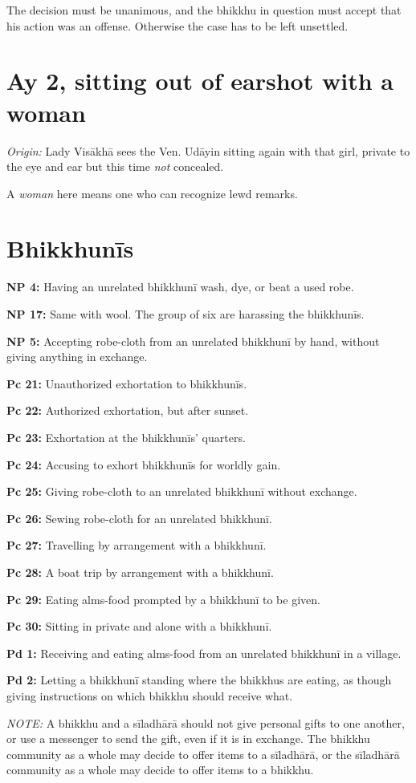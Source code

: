 The decision must be unanimous, and the bhikkhu in question must accept
that his action was an offense. Otherwise the case has to be left
unsettled.

\section{Ay 2, sitting out of earshot with a woman}

\emph{Origin:} Lady Visākhā sees the Ven. Udāyin sitting again with that
girl, private to the eye and ear but this time \emph{not} concealed.

A \emph{woman} here means one who can recognize lewd remarks.

\clearpage

\section{Bhikkhunīs}

\textbf{NP 4:} Having an unrelated bhikkhunī wash, dye, or beat a used
robe.

\textbf{NP 17:} Same with wool. The group of six are harassing the
bhikkhunīs.

\textbf{NP 5:} Accepting robe-cloth from an unrelated bhikkhunī by hand,
without giving anything in exchange.

\textbf{Pc 21:} Unauthorized exhortation to bhikkhunīs.

\textbf{Pc 22:} Authorized exhortation, but after sunset.

\textbf{Pc 23:} Exhortation at the bhikkhunīs' quarters.

\textbf{Pc 24:} Accusing to exhort bhikkhunīs for worldly gain.

\textbf{Pc 25:} Giving robe-cloth to an unrelated bhikkhunī without
exchange.

\textbf{Pc 26:} Sewing robe-cloth for an unrelated bhikkhunī.

\textbf{Pc 27:} Travelling by arrangement with a bhikkhunī.

\textbf{Pc 28:} A boat trip by arrangement with a bhikkhunī.

\textbf{Pc 29:} Eating alms-food prompted by a bhikkhunī to be given.

\textbf{Pc 30:} Sitting in private and alone with a bhikkhunī.

\textbf{Pd 1:} Receiving and eating alms-food from an unrelated
bhikkhunī in a village.

\textbf{Pd 2:} Letting a bhikkhunī standing where the bhikkhus are
eating, as though giving instructions on which bhikkhu should receive
what.

\emph{NOTE:} A bhikkhu and a sīladhārā should not give personal gifts to
one another, or use a messenger to send the gift, even if it is in
exchange. The bhikkhu community as a whole may decide to offer items to
a sīladhārā, or the sīladhārā community as a whole may decide to offer
items to a bhikkhu.

